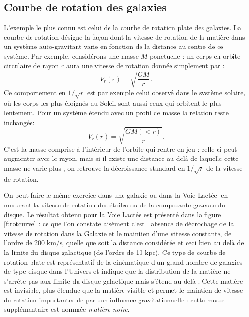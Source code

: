 \subsection{Courbe de rotation des galaxies}
L'exemple le plus connu est celui de la courbe de rotation plate des galaxies. La courbe de rotation désigne  la façon dont la vitesse de rotation de la matière dans un système auto-gravitant varie en fonction de la distance au centre de ce système. Par exemple, considérons une masse $M$ ponctuelle : un corps en orbite circulaire de rayon $r$ aura une vitesse de rotation donnée simplement par :
\begin{equation}
V_r(r)=\sqrt{\frac{GM}{r}}.
\end{equation} 
Ce comportement en $1/\sqrt{r}$ est par exemple celui observé dans le système solaire, où les corps les plus éloignés du Soleil sont aussi ceux qui orbitent le plus lentement. Pour un système étendu avec un profil de masse la relation reste inchangée:
\begin{equation}
V_r(r)=\sqrt{\frac{GM(<r)}{r}}.
\end{equation}
C'est la masse comprise à l'intérieur de l'orbite qui rentre en jeu : celle-ci peut augmenter avec le rayon, mais si il existe une distance au delà de laquelle cette masse ne varie plus , on retrouve la décroissance standard en $1/\sqrt{r}$ de la vitesse de rotation.

On peut faire le même exercice dans une galaxie ou dans la Voie Lactée, en mesurant la vitesse de rotation des étoiles ou de la composante gazeuse du disque. Le résultat obtenu pour la Voie Lactée est présenté dans la figure \ref{f:rotcurve} : ce que l'on constate aisément c'est l'absence de décrochage de la vitesse de rotation dans la Galaxie et le maintien d'une vitesse constante, de l'ordre de 200 km/s, quelle que soit la distance considérée et ceci bien au delà de la limite du disque galactique (de l'ordre de 10 kpc). Ce type de courbe de rotation plate est représentatif de la cinématique d'un grand nombre de galaxies de type disque dans l'Univers et indique que la distribution de la matière ne s'arrête pas aux limite du disque galactique mais s'étend au delà . Cette matière est invisible, plus étendue que la matière visible et permet le maintien de vitesse de rotation importantes de par son influence gravitationnelle : cette masse supplémentaire est nommée \textit{matière noire}.

